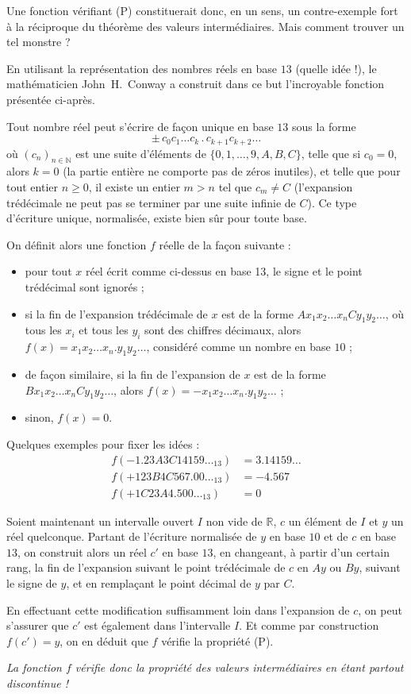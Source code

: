 \documentclass[a4paper,11pt]{article}
\newcommand{\N}{\ensuremath{\mathbb{N}}\xspace}
\newcommand{\R}{\ensuremath{\mathbb{R}}\xspace}
\begin{document}
\medskip
Une fonction vérifiant (P) constituerait donc, en un sens, un contre-exemple
fort à la réciproque du théorème des valeurs intermédiaires. Mais comment
trouver un tel monstre ?

En utilisant la représentation des nombres réels en base $13$
(quelle idée !), le mathématicien John~H.~Conway
a construit dans ce but l'incroyable fonction présentée ci-après.

\medskip
Tout nombre réel peut s'écrire de façon unique en base $13$ sous la forme
\[
  \pm\, c_0c_1\ldots c_k\,.\,c_{k+1}c_{k+2}\ldots
\]
où $(c_n)_{n\in\N}$ est une suite d'éléments de
$\{0, 1, \ldots, 9, A, B, C\}$, telle que si $c_0=0$, alors $k=0$ (la
partie entière ne comporte pas de zéros inutiles), et telle que pour tout
entier $n\ge0$, il existe un entier $m>n$ tel que $c_m\neq C$ (l'expansion
trédécimale ne peut pas se terminer par une suite infinie de $C$).
Ce type d'écriture unique, normalisée, existe bien sûr pour toute base.

\smallskip
On définit alors une fonction $f$ réelle de la façon suivante :
\begin{itemize}
\item pour tout $x$ réel écrit comme ci-dessus en base 13,
  le signe et le point trédécimal sont ignorés ;
\item si la fin de l'expansion trédécimale de $x$ est de la forme
  $Ax_1x_2\ldots x_nCy_1y_2\ldots$, où tous les $x_i$ et tous les $y_i$
  sont des chiffres décimaux, alors $f(x)=x_1x_2\ldots x_n.y_1y_2\ldots$,
  considéré comme un nombre en base $10$ ;
\item de façon similaire, si la fin de l'expansion de
  $x$ est de la forme $Bx_1x_2\ldots x_nCy_1y_2\ldots$, alors
  $f(x)=-x_1x_2\ldots x_n.y_1y_2\ldots$ ;
\item sinon, $f(x)=0$.
\end{itemize}

\smallskip
Quelques exemples pour fixer les idées :
\begin{align*}
  f(-1.23A3C14159\ldots_{13}) &= 3.14159\ldots \\
  f(+123B4C567.00\ldots_{13}) &= -4.567 \\
  f(+1C23A4.500\ldots_{13})   &= 0
\end{align*}

Soient maintenant un intervalle ouvert $I$ non vide de $\R$, $c$ un
élément de $I$ et $y$ un réel quelconque.
Partant de l'écriture normalisée de $y$ en base $10$ et de $c$ en base $13$,
on construit alors un réel $c'$ en base $13$, en changeant, à partir
d'un certain rang, la fin de l'expansion suivant le point
trédécimale de $c$ en $Ay$ ou $By$, suivant le signe de $y$, et en remplaçant
le point décimal de $y$ par $C$.

En effectuant cette modification suffisamment loin dans l'expansion
de $c$, on peut s'assurer que $c'$ est également dans
l'intervalle $I$. Et comme par construction $f(c')=y$, on en déduit que
$f$ vérifie la propriété (P).

\begin{center}\slshape
La fonction $f$ vérifie donc la propriété des valeurs intermédiaires en
étant partout discontinue !
\end{center}
\end{document}

